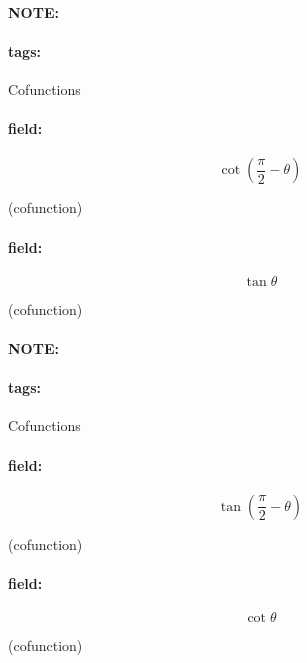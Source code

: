 \documentclass[12pt]{article}
\newenvironment{note}{\paragraph{NOTE:}}{}
\newenvironment{field}{\paragraph{field:}}{}
\newcommand*{\tags}[1]{\paragraph{tags: }#1}
\begin{document}
\begin{note}
    \tags{Cofunctions}
    \begin{field}
    \[  
        \cot(\frac{\pi}{2} - \theta)
    \] 
    \begin{center}
    (cofunction)
\end{center}
    \end{field}
    \begin{field}
    \[
        \tan \theta
    \] 
    \begin{center}
    (cofunction)
\end{center}
    \end{field}
\end{note}

\begin{note}
    \tags{Cofunctions}
    \begin{field}
    \[  
        \tan(\frac{\pi}{2} - \theta)
    \] 
    \begin{center}
    (cofunction)
    \end{center}
    \end{field}
    \begin{field}
    \[
        \cot \theta 
    \] 
    \begin{center}
    (cofunction)
    \end{center}
    \end{field}
\end{note}
\end{document}
